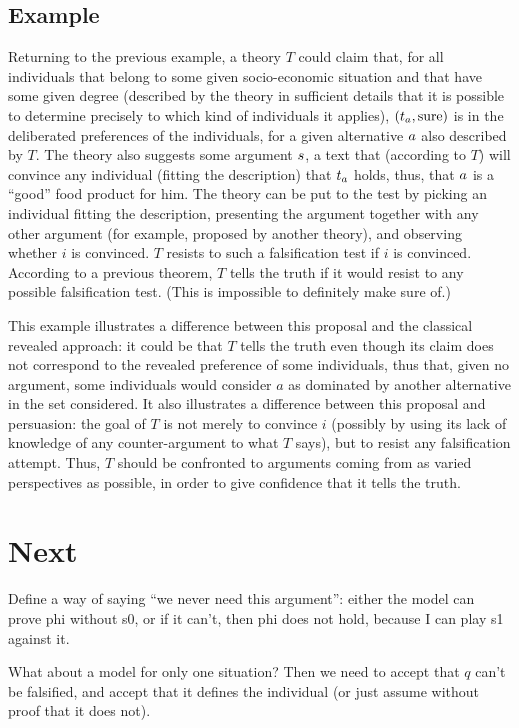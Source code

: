 \documentclass[version=last, pagesize, twoside=off, bibliography=totoc, DIV=calc, fontsize=12pt, a4paper, french, english]{scrartcl}
\begin{document}
\subsection{Example}
\begin{example}[(cont.)]
	Returning to the previous example, a theory $T$ could claim that, for all individuals that belong to some given socio-economic situation and that have some given degree (described by the theory in sufficient details that it is possible to determine precisely to which kind of individuals it applies), $(t_a, \text{sure})$ is in the deliberated preferences of the individuals, for a given alternative $a$ also described by $T$. 
The theory also suggests some argument $\ar$, a text that (according to $T$) will convince any individual (fitting the description) that $t_a$ holds, thus, that $a$ is a “good” food product for him. 
The theory can be put to the test by picking an individual fitting the description, presenting the argument together with any other argument (for example, proposed by another theory), and observing whether $i$ is convinced.
$T$ resists to such a falsification test if $i$ is convinced. According to a previous theorem, $T$ tells the truth if it would resist to any possible falsification test. (This is impossible to definitely make sure of.)
\end{example}
This example illustrates a difference between this proposal and the classical revealed approach: it could be that $T$ tells the truth even though its claim does not correspond to the revealed preference of some individuals, thus that, given no argument, some individuals would consider $a$ as dominated by another alternative in the set considered. It also illustrates a difference between this proposal and persuasion: the goal of $T$ is not merely to convince $i$ (possibly by using its lack of knowledge of any counter-argument to what $T$ says), but to resist any falsification attempt. Thus, $T$ should be confronted to arguments coming from as varied perspectives as possible, in order to give confidence that it tells the truth.

\section{Next}
Define a way of saying “we never need this argument”: either the model can prove phi without s0, or if it can’t, then phi does not hold, because I can play s1 against it. 

What about a model for only one situation? Then we need to accept that $q$ can’t be falsified, and accept that it defines the individual (or just assume without proof that it does not).
\end{document}
